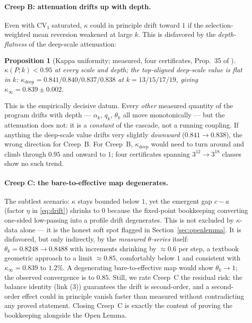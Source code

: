 \documentclass[11pt]{article}
\newtheorem{proposition}[theorem]{Proposition}
\theoremstyle{definition}
\theoremstyle{remark}
\newcommand{\CV}{\mathrm{CV}}
\newcommand{\kap}{\kappa}
\begin{document}
\paragraph{Creep B: attenuation drifts up with depth.}
Even with $\CV_1$ saturated, $\kap$ could in principle drift toward $1$ if the
selection-weighted mean reversion weakened at large $k$. This is disfavored by
the \emph{depth-flatness} of the deep-scale attenuation:

\begin{proposition}[Kappa uniformity; measured, four certificates, Prop.~35 of
\cite{NOTE}]\label{prop:uniform}
$\kap(P; k) < 0.95$ at every scale and depth; the top-aligned deep-scale value
is flat in $k$: $\kap_{\mathrm{deep}} = 0.841/0.840/0.837/0.838$ at
$k = 13/15/17/19$, giving $\kap_\infty = 0.839 \pm 0.002$.
\end{proposition}

This is the empirically decisive datum. Every \emph{other} measured quantity of
the program drifts with depth --- $\alpha_k$, $q_k$, $\theta_k$ all move
monotonically --- but the attenuation does not: it is a \emph{constant} of the
cascade, not a running coupling. If anything the deep-scale value drifts very
slightly \emph{downward} ($0.841 \to 0.838$), the wrong direction for Creep~B.
For Creep~B, $\kap_{\mathrm{deep}}$ would need to turn around and climb through
$0.95$ and onward to $1$; four certificates spanning
$3^{12}\!\to\!3^{18}$ classes show no such trend.

\paragraph{Creep C: the bare-to-effective map degenerates.}
The subtlest scenario: $\kap$ stays bounded below $1$, yet the emergent gap
$c - a$ (factor $\eta$ in \eqref{eq:drift}) shrinks to $0$ because the
fixed-point bookkeeping converting one-sided low-passing into a profile drift
degenerates. This is not excluded by $\kap$-data alone --- it is the honest soft
spot flagged in Section~\ref{sec:openlemma}. It is disfavored, but only
indirectly, by the \emph{measured $\theta$-series} itself: $\theta_k =
0.8248 \to 0.8488$ with increments shrinking by $\approx 0.6$ per step, a
textbook geometric approach to a limit $\approx 0.85$, comfortably below $1$
and consistent with $\kap_\infty = 0.839$ to $1.2\%$. A degenerating
bare-to-effective map would show $\theta_k \to 1$; the observed convergence is
to $0.85$. Still, we rate Creep~C the residual risk: the balance identity
(link (3)) guarantees the drift is second-order, and a second-order effect
could in principle vanish faster than measured without contradicting any proved
statement. Closing Creep~C is exactly the content of proving the bookkeeping
alongside the Open Lemma.
\end{document}
